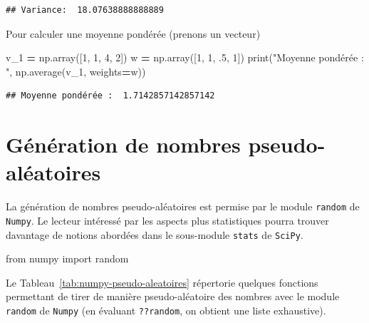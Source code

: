 \documentclass[12pt,]{book}
\newenvironment{Shaded}{\begin{snugshade}}{\end{snugshade}}
\newcommand{\DecValTok}[1]{\textcolor[rgb]{0.00,0.00,0.81}{#1}}
\newcommand{\StringTok}[1]{\textcolor[rgb]{0.31,0.60,0.02}{#1}}
\newcommand{\ImportTok}[1]{#1}
\newcommand{\OperatorTok}[1]{\textcolor[rgb]{0.81,0.36,0.00}{\textbf{#1}}}
\newcommand{\BuiltInTok}[1]{#1}
\newcommand{\NormalTok}[1]{#1}
\numberwithin{equation}{section}
\numberwithin{countremarque}{section}
\begin{document}
\begin{lstlisting}
## Variance:  18.07638888888889
\end{lstlisting}

Pour calculer une moyenne pondérée (prenons un vecteur)

\begin{Shaded}
\begin{Highlighting}[]
\NormalTok{v_1 }\OperatorTok{=}\NormalTok{ np.array([}\DecValTok{1}\NormalTok{, }\DecValTok{1}\NormalTok{, }\DecValTok{4}\NormalTok{, }\DecValTok{2}\NormalTok{])}
\NormalTok{w }\OperatorTok{=}\NormalTok{ np.array([}\DecValTok{1}\NormalTok{, }\DecValTok{1}\NormalTok{, .}\DecValTok{5}\NormalTok{, }\DecValTok{1}\NormalTok{])}
\BuiltInTok{print}\NormalTok{(}\StringTok{"Moyenne pondérée : "}\NormalTok{, np.average(v_1, weights}\OperatorTok{=}\NormalTok{w))}
\end{Highlighting}
\end{Shaded}

\begin{lstlisting}
## Moyenne pondérée :  1.7142857142857142
\end{lstlisting}

\section{Génération de nombres
pseudo-aléatoires}\label{generation-de-nombres-pseudo-aleatoires}

La génération de nombres pseudo-aléatoires est permise par le module
\texttt{random} de \texttt{Numpy}. Le lecteur intéressé par les aspects
plus statistiques pourra trouver davantage de notions abordées dans le
sous-module \texttt{stats} de \texttt{SciPy}.

\begin{Shaded}
\begin{Highlighting}[]
\ImportTok{from}\NormalTok{ numpy }\ImportTok{import}\NormalTok{ random}
\end{Highlighting}
\end{Shaded}

Le Tableau~\ref{tab:numpy-pseudo-aleatoires} répertorie quelques
fonctions permettant de tirer de manière pseudo-aléatoire des nombres
avec le module \texttt{random} de \texttt{Numpy} (en évaluant
\texttt{??random}, on obtient une liste exhaustive).
\end{document}
